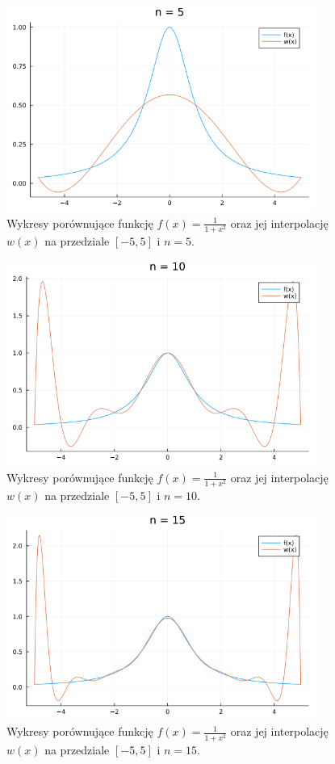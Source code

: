 \documentclass{article}
\begin{document}
\begin{figure}[H]
    \centering
    \includegraphics[width=0.9\textwidth]{../plots/ex5_2_n5.png}
    \caption{Wykresy porównujące funkcję $f(x) = \frac{1}{1+x^2}$ oraz jej interpolację $w(x)$ na przedziale $[-5, 5]$ i $n=5$.}
\end{figure}
\begin{figure}[H]
    \centering
    \includegraphics[width=0.9\textwidth]{../plots/ex5_2_n10.png}
    \caption{Wykresy porównujące funkcję $f(x) = \frac{1}{1+x^2}$ oraz jej interpolację $w(x)$ na przedziale $[-5, 5]$ i $n=10$.}
\end{figure}
\begin{figure}[H]
    \centering
    \includegraphics[width=0.9\textwidth]{../plots/ex5_2_n15.png}
    \caption{Wykresy porównujące funkcję $f(x) = \frac{1}{1+x^2}$ oraz jej interpolację $w(x)$ na przedziale $[-5, 5]$ i $n=15$.}
\end{figure}
\end{document}
